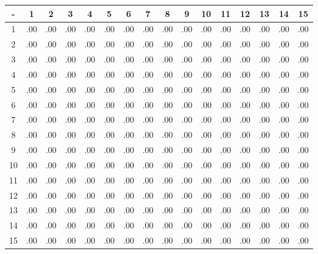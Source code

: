 {\tiny
\begin{tabular}{ | c | c c c c c c c c c c c c c c c | }

\hline
 -  & 1 & 2 & 3 & 4 & 5 & 6 & 7 & 8 & 9 & 10 & 11 & 12 & 13 & 14 & 15 \\ \hline
1  & .00 & .00 & .00 & .00 & .00 & .00 & .00 & .00 & .00 & .00  & .00  & .00  & .00  & .00  & .00  \\
2  & .00 & .00 & .00 & .00 & .00 & .00 & .00 & .00 & .00 & .00  & .00  & .00  & .00  & .00  & .00  \\
3  & .00 & .00 & .00 & .00 & .00 & .00 & .00 & .00 & .00 & .00  & .00  & .00  & .00  & .00  & .00  \\
4  & .00 & .00 & .00 & .00 & .00 & .00 & .00 & .00 & .00 & .00  & .00  & .00  & .00  & .00  & .00  \\
5  & .00 & .00 & .00 & .00 & .00 & .00 & .00 & .00 & .00 & .00  & .00  & .00  & .00  & .00  & .00  \\
6  & .00 & .00 & .00 & .00 & .00 & .00 & .00 & .00 & .00 & .00  & .00  & .00  & .00  & .00  & .00  \\
7  & .00 & .00 & .00 & .00 & .00 & .00 & .00 & .00 & .00 & .00  & .00  & .00  & .00  & .00  & .00  \\
8  & .00 & .00 & .00 & .00 & .00 & .00 & .00 & .00 & .00 & .00  & .00  & .00  & .00  & .00  & .00  \\
9  & .00 & .00 & .00 & .00 & .00 & .00 & .00 & .00 & .00 & .00  & .00  & .00  & .00  & .00  & .00  \\
10 & .00 & .00 & .00 & .00 & .00 & .00 & .00 & .00 & .00 & .00  & .00  & .00  & .00  & .00  & .00  \\
11 & .00 & .00 & .00 & .00 & .00 & .00 & .00 & .00 & .00 & .00  & .00  & .00  & .00  & .00  & .00  \\
12 & .00 & .00 & .00 & .00 & .00 & .00 & .00 & .00 & .00 & .00  & .00  & .00  & .00  & .00  & .00  \\
13 & .00 & .00 & .00 & .00 & .00 & .00 & .00 & .00 & .00 & .00  & .00  & .00  & .00  & .00  & .00  \\
14 & .00 & .00 & .00 & .00 & .00 & .00 & .00 & .00 & .00 & .00  & .00  & .00  & .00  & .00  & .00  \\
15 & .00 & .00 & .00 & .00 & .00 & .00 & .00 & .00 & .00 & .00  & .00  & .00  & .00  & .00  & .00  \\ \hline

\end{tabular}}




